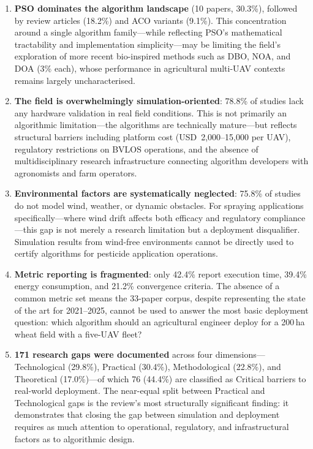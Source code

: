 \documentclass[review,3p,times]{elsarticle}
\begin{document}
\begin{enumerate}
  \item \textbf{PSO dominates the algorithm landscape} (10 papers, 30.3\%), followed by review articles (18.2\%) and ACO variants (9.1\%). This concentration around a single algorithm family---while reflecting PSO's mathematical tractability and implementation simplicity---may be limiting the field's exploration of more recent bio-inspired methods such as DBO, NOA, and DOA (3\% each), whose performance in agricultural multi-UAV contexts remains largely uncharacterised.

  \item \textbf{The field is overwhelmingly simulation-oriented}: 78.8\% of studies lack any hardware validation in real field conditions. This is not primarily an algorithmic limitation---the algorithms are technically mature---but reflects structural barriers including platform cost (USD~2,000--15,000 per UAV), regulatory restrictions on BVLOS operations, and the absence of multidisciplinary research infrastructure connecting algorithm developers with agronomists and farm operators.

  \item \textbf{Environmental factors are systematically neglected}: 75.8\% of studies do not model wind, weather, or dynamic obstacles. For spraying applications specifically---where wind drift affects both efficacy and regulatory compliance---this gap is not merely a research limitation but a deployment disqualifier. Simulation results from wind-free environments cannot be directly used to certify algorithms for pesticide application operations.

  \item \textbf{Metric reporting is fragmented}: only 42.4\% report execution time, 39.4\% energy consumption, and 21.2\% convergence criteria. The absence of a common metric set means the 33-paper corpus, despite representing the state of the art for 2021--2025, cannot be used to answer the most basic deployment question: which algorithm should an agricultural engineer deploy for a 200\,ha wheat field with a five-UAV fleet?

  \item \textbf{171 research gaps were documented} across four dimensions---Technological (29.8\%), Practical (30.4\%), Methodological (22.8\%), and Theoretical (17.0\%)---of which 76 (44.4\%) are classified as Critical barriers to real-world deployment. The near-equal split between Practical and Technological gaps is the review's most structurally significant finding: it demonstrates that closing the gap between simulation and deployment requires as much attention to operational, regulatory, and infrastructural factors as to algorithmic design.
\end{enumerate}
\end{document}
